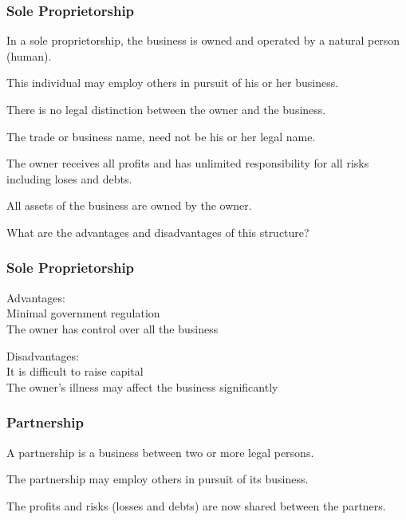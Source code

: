 \begin{frame}
\frametitle{Sole Proprietorship}

In a sole proprietorship, the business is owned and operated by a natural person (human).

This individual may employ others in pursuit of his or her business.

There is no legal distinction between the owner and the business.

The trade or business name, need not be his or her legal name.

The owner receives all profits and has unlimited responsibility for all risks including loses and debts.

All assets of the business are owned by the owner.

What are the advantages and disadvantages of this structure?

\end{frame}



\begin{frame}
\frametitle{Sole Proprietorship}

Advantages:\\
\quad Minimal government regulation\\
\quad The owner has control over all the business

Disadvantages:\\
\quad It is difficult to raise capital\\
\quad The owner's illness may affect the business significantly

\end{frame}



\begin{frame}
\frametitle{Partnership}

A partnership is a business between two or more legal persons.

The partnership may employ others in pursuit of its business.

The profits and risks (losses and debts) are now shared between the partners.

\end{frame}



